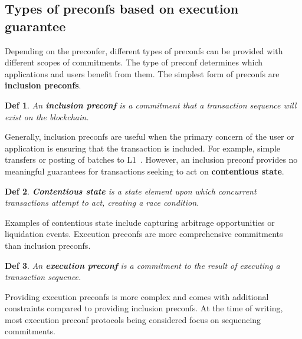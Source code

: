 \documentclass[a4paper]{article}
\theoremstyle{boldstyle}
\newtheorem*{definitionx}{Def}
\newenvironment{definition}
  {\begin{defopenboxq}\begin{definitionx}}
  {\end{definitionx}\end{defopenboxq}}
\begin{document}
    \subsection{Types of preconfs based on execution guarantee}
        Depending on the preconfer, different types of preconfs can be provided with different scopes of commitments. The type of preconf determines which applications and users benefit from them.
        The simplest form of preconfs are \textbf{inclusion preconfs}. 
        \begin{definition}
        An \textbf{inclusion preconf} is a commitment that a transaction sequence will exist on the blockchain. 
        \end{definition}        
        Generally, inclusion preconfs are useful when the primary concern of the user or application is ensuring that the transaction is included. For example, simple transfers or posting of batches to L1~\cite{W:PreconfirmationsforVanillaBasedRollups,W:APricingModelforInclusionPreconfirmations}.  
        However, an inclusion preconf provides no meaningful guarantees for transactions seeking to act on \textbf{contentious state}. 
        \begin{definition}
        \textbf{Contentious state} is a state element upon which concurrent transactions attempt to act, creating a race condition.
        \end{definition}
        Examples of contentious state include capturing arbitrage opportunities or liquidation events.
        Execution preconfs are more comprehensive commitments than inclusion preconfs.
        \begin{definition}
        An \textbf{execution preconf} is a commitment to the result of executing a transaction sequence.
        \end{definition}
        Providing execution preconfs is more complex and comes with additional constraints compared to providing inclusion preconfs.
        At the time of writing, most execution preconf protocols being considered focus on sequencing commitments. 
\end{document}
